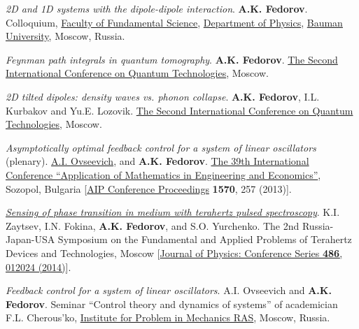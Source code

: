 \documentclass[10pt,a4paper,sans]{moderncv}
\begin{document}
	{\textit{2D and 1D systems with the dipole-dipole interaction}.
	\textbf{A.K. Fedorov}.
	Colloquium, 
	\textcolor{blue}{\href{http://fn.bmstu.ru/}{Faculty of Fundamental Science}},
	\textcolor{blue}{\href{http://fn.bmstu.ru/index.php/fn4}{Department of Physics}},
	\textcolor{blue}{\href{http://bmstu.ru/}{Bauman University}}, Moscow, Russia.}
	
	{\textit{Feynman path integrals in quantum tomography}.
	\textbf{A.K. Fedorov}.
	\textcolor{blue}{\href{http://www.rqc.ru/events/?ELEMENT_ID=888}{The Second International Conference on Quantum Technologies}},
	Moscow.}
	
	{\textit{2D tilted dipoles: density waves vs. phonon collapse}.
	\textbf{A.K. Fedorov}, I.L. Kurbakov and Yu.E. Lozovik.
	\textcolor{blue}{\href{http://www.rqc.ru/events/?ELEMENT_ID=888}{The Second International Conference on Quantum Technologies}},
	Moscow.}	
	
	{\textit{Asymptotically optimal feedback control for a system of linear oscillators} 
	({plenary}).
	\underline{A.I. Ovseevich}, and \textbf{A.K. Fedorov}.
	\textcolor{blue}{\href{http://www.tu-sofia.bg/eng_new/fpmi/amee/}{The 39th International Conference ``Application of Mathematics in Engineering and Economics''}}, Sozopol, Bulgaria
	[\textcolor{blue}{\href{http://dx.doi.org/10.1063/1.4854764}{{AIP Conference Proceedings}}} \textbf{1570}, 257 (2013)].}
	
	{\textit{\textcolor{blue}{\href{http://dx.doi.org/10.1088/1742-6596/486/1/012024}{Sensing of phase transition in medium with terahertz pulsed spectroscopy}}}.
	K.I. Zaytsev, I.N. Fokina, \textbf{A.K. Fedorov}, and S.O. Yurchenko.
	The 2nd Russia-Japan-USA Symposium on the Fundamental and Applied Problems of Terahertz Devices and Technologies, Moscow 
	[\textcolor{blue}{\href{http://dx.doi.org/10.1088/1742-6596/486/1/012024}{Journal of Physics: Conference Series \textbf{486}, 012024 (2014)}}].}
	
	{\textit{Feedback control for a system of linear oscillators}.
	A.I. Ovseevich and \textbf{A.K. Fedorov}.
	Seminar ``Control theory and dynamics of systems'' of academician F.L. Cherous'ko,
	\textcolor{blue}{\href{http://www.ipmnet.ru/index_en.htm}{Institute for Problem in Mechanics RAS}},
	Moscow, Russia.}
	
\end{document}
